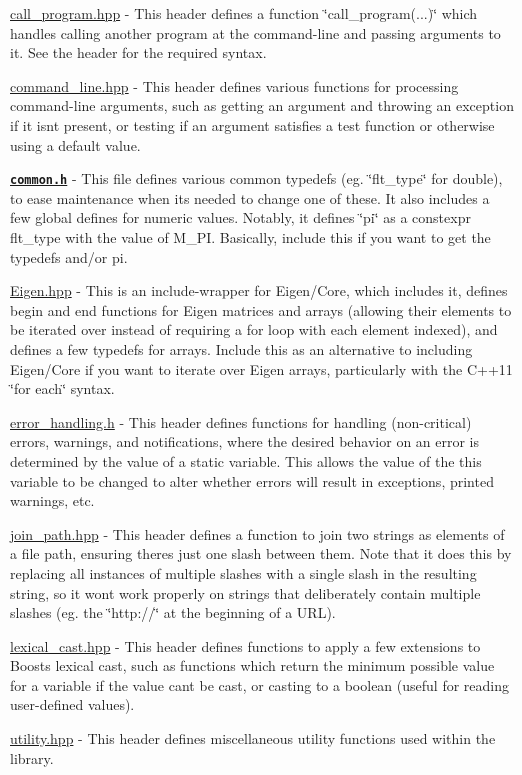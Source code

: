 \begin{DoxyItemize}
\item \hyperlink{call__program_8hpp}{call\+\_\+program.\+hpp} -\/ This header defines a function \char`\"{}call\+\_\+program(...)\char`\"{} which handles calling another program at the command-\/line and passing arguments to it. See the header for the required syntax.
\item \hyperlink{command__line_8hpp}{command\+\_\+line.\+hpp} -\/ This header defines various functions for processing command-\/line arguments, such as getting an argument and throwing an exception if it isn\textquotesingle{}t present, or testing if an argument satisfies a test function or otherwise using a default value.
\item \href{lib_2IceBRG__main_2common_8h.html}{\tt {\bfseries common.\+h}} -\/ This file defines various common typedefs (eg. \char`\"{}flt\+\_\+type\char`\"{} for double), to ease maintenance when its needed to change one of these. It also includes a few global defines for numeric values. Notably, it defines \char`\"{}pi\char`\"{} as a constexpr flt\+\_\+type with the value of M\+\_\+\+P\+I. Basically, include this if you want to get the typedefs and/or pi.
\item \hyperlink{Eigen_8hpp}{Eigen.\+hpp} -\/ This is an include-\/wrapper for Eigen/\+Core, which includes it, defines begin and end functions for Eigen matrices and arrays (allowing their elements to be iterated over instead of requiring a for loop with each element indexed), and defines a few typedefs for arrays. Include this as an alternative to including Eigen/\+Core if you want to iterate over Eigen arrays, particularly with the C++11 \char`\"{}for each\char`\"{} syntax.
\item \hyperlink{error__handling_8h}{error\+\_\+handling.\+h} -\/ This header defines functions for handling (non-\/critical) errors, warnings, and notifications, where the desired behavior on an error is determined by the value of a static variable. This allows the value of the this variable to be changed to alter whether errors will result in exceptions, printed warnings, etc.
\item \hyperlink{join__path_8hpp}{join\+\_\+path.\+hpp} -\/ This header defines a function to join two strings as elements of a file path, ensuring there\textquotesingle{}s just one slash between them. Note that it does this by replacing all instances of multiple slashes with a single slash in the resulting string, so it won\textquotesingle{}t work properly on strings that deliberately contain multiple slashes (eg. the \char`\"{}http\+://\char`\"{} at the beginning of a U\+R\+L).
\item \hyperlink{lexical__cast_8hpp}{lexical\+\_\+cast.\+hpp} -\/ This header defines functions to apply a few extensions to Boost\textquotesingle{}s lexical cast, such as functions which return the minimum possible value for a variable if the value can\textquotesingle{}t be cast, or casting to a boolean (useful for reading user-\/defined values).
\item \hyperlink{utility_8hpp}{utility.\+hpp} -\/ This header defines miscellaneous utility functions used within the library.
\end{DoxyItemize}

